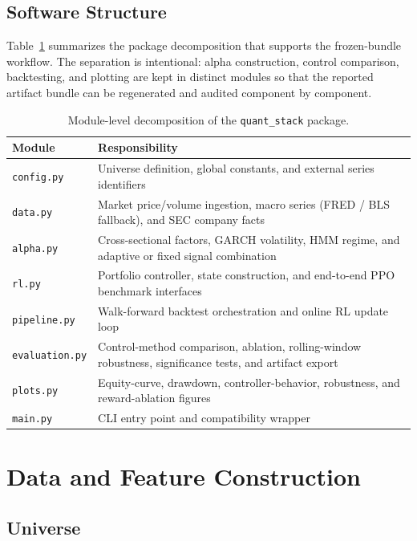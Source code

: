 \documentclass[10pt,twocolumn]{article}
\begin{document}
\subsection{Software Structure}

Table~\ref{tab:modules} summarizes the package decomposition that supports the
frozen-bundle workflow. The separation is intentional: alpha construction,
control comparison, backtesting, and plotting are kept in distinct modules so
that the reported artifact bundle can be regenerated and audited component by
component.

\begin{table}[t]
\centering
\caption{Module-level decomposition of the \texttt{quant\_stack} package.}
\label{tab:modules}
\small
\begin{tabular}{@{} l p{} @{}}
\toprule
\textbf{Module} & \textbf{Responsibility} \\
\midrule
\texttt{config.py}   & Universe definition, global constants, and external series identifiers \\
\texttt{data.py}     & Market price/volume ingestion, macro series (FRED / BLS fallback), and SEC company facts \\
\texttt{alpha.py}    & Cross-sectional factors, GARCH volatility, HMM regime, and adaptive or fixed signal combination \\
\texttt{rl.py}       & Portfolio controller, state construction, and end-to-end PPO benchmark interfaces \\
\texttt{pipeline.py} & Walk-forward backtest orchestration and online RL update loop \\
\texttt{evaluation.py} & Control-method comparison, ablation, rolling-window robustness, significance tests, and artifact export \\
\texttt{plots.py}    & Equity-curve, drawdown, controller-behavior, robustness, and reward-ablation figures \\
\texttt{main.py}     & CLI entry point and compatibility wrapper \\
\bottomrule
\end{tabular}
\end{table}

\section{Data and Feature Construction}

\subsection{Universe}
\end{document}
